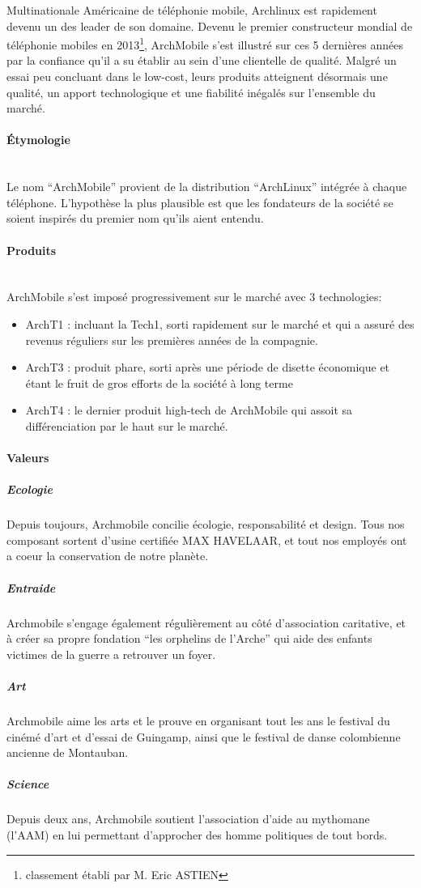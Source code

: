 Multinationale Américaine de téléphonie mobile, Archlinux 
est rapidement devenu un des leader de son domaine.
Devenu le premier constructeur mondial de téléphonie mobiles 
en 2013\footnote{classement établi par M. Eric ASTIEN},
ArchMobile s'est illustré sur ces 5 dernières années par
la confiance qu'il a su établir au sein d'une clientelle 
de qualité. Malgré un essai peu concluant dans le low-cost,
leurs produits atteignent désormais une qualité, un apport
technologique et une fiabilité inégalés sur l'ensemble du
marché.



\paragraph{\'Etymologie}~\\
Le nom ``ArchMobile'' provient de la distribution ``ArchLinux''
intégrée à  chaque téléphone. L'hypothèse la plus plausible
est que les fondateurs de la société se soient inspirés du premier
nom qu'ils aient entendu.

\paragraph{Produits}~\\
ArchMobile s'est imposé progressivement sur le marché avec 3 technologies:
\begin{itemize}
\item ArchT1 : incluant la Tech1, sorti rapidement sur le marché et qui a assuré 
  des revenus réguliers sur les premières années de la compagnie.
\item ArchT3 : produit phare, sorti après une période de disette 
  économique et étant le fruit de gros efforts de la société à long terme
\item ArchT4 : le dernier produit high-tech de ArchMobile qui assoit
  sa différenciation par le haut sur le marché.
\end{itemize}

\paragraph{Valeurs}
\subparagraph{Ecologie}
Depuis toujours, Archmobile concilie écologie, responsabilité et
design. Tous nos composant sortent d'usine certifiée MAX HAVELAAR, et
tout nos employés ont a coeur la conservation de notre planète.
\subparagraph{Entraide}
Archmobile s'engage également régulièrement au côté d'association
caritative, et à créer sa propre fondation ``les orphelins de
l'Arche'' qui aide des enfants victimes de la guerre a retrouver un
foyer.
\subparagraph{Art}
Archmobile aime les arts et le prouve en organisant tout les ans le
festival du cinémé d'art et d'essai de Guingamp, ainsi que le festival
de danse colombienne ancienne de Montauban.
\subparagraph{Science}
Depuis deux ans, Archmobile soutient l'association d'aide au mythomane
(l'AAM) en lui permettant d'approcher des homme politiques de tout
bords.
